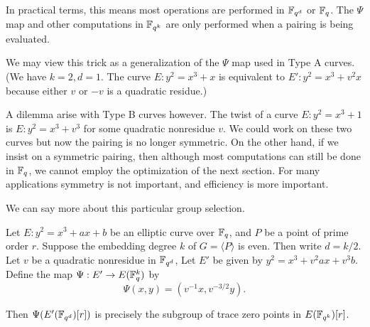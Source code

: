 In practical terms, this means most operations are performed in
$\mathbb{F}_{q^d}$  or $\mathbb{F}_q$. The $\Psi$ map and
other computations in $\mathbb{F}_{q^k}$ are only performed
when a pairing is being evaluated.

We may view this trick as a
generalization of the $\Psi$ map used in Type A curves.
(We have $k =2 , d = 1$.
The curve $E : y^2 = x^3 + x$ is equivalent to $E' : y^2 = x^3 + v^2 x$
because either $v$ or $-v$ is a quadratic residue.)

A dilemma arise with Type B curves however. The twist
of a curve $E : y^2 = x^3 + 1 $ is $E: y^2 = x^3 + v^3 $ for some
quadratic nonresidue $v$. We could work on these two curves but now
the pairing is no longer symmetric. On the other hand, if we insist on
a symmetric pairing, then although most computations can still be done
in $\mathbb{F}_q$, we cannot employ the optimization of the next section. For
many applications symmetry is not important, and efficiency is more important.

We can say more about this particular group selection.

\begin{theorem}
Let $E : y^2 = x^3 + a x + b$ be an elliptic curve over $\mathbb{F}_q$,
and $P$ be a point of prime order $r$.
Suppose the embedding degree $k$ of $G = \langle P \rangle$ is even.
Then write $d = k / 2$. Let $v$ be a quadratic nonresidue in $\mathbb{F}_{q^d}$,
Let $E'$ be given by $y^2 = x^3 + v^2 a x + v^3 b$.
Define the map $\Psi:E'\rightarrow E(\mathbb{F}_q^k)$ by
\[ \Psi(x,y) = (v^{-1}x, v^{-3/2}y) . \]

Then $\Psi(E'(\mathbb{F}_{q^d})[r])$ is precisely the subgroup of trace zero points
in $E(\mathbb{F}_{q^k})[r]$.
\end{theorem}

